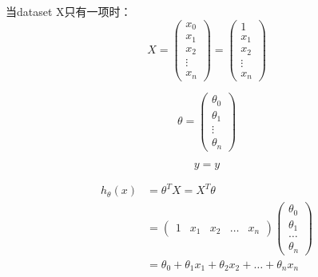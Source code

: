 \documentclass[12pt]{article}   %
\begin{document}
当dataset X只有一项时：
\begin{equation}
X = 
	\left(
		\begin{matrix}
			x_0 \\
			x_1 \\
			x_2 \\
			\vdots \\
			x_n
		\end{matrix}
	\right) 
= 
  	\left(
		\begin{matrix}
			1 \\
			x_1 \\
			x_2 \\
			\vdots \\
			x_n
		\end{matrix}
	\right)
\end{equation}

\begin{equation}
\theta = 
	\left(
		\begin{matrix}
			\theta_0 \\
			\theta_1 \\
			\vdots \\
			\theta_n
		\end{matrix}
	\right)
\end{equation}

\begin{equation}
y = y
\end{equation}

\begin{equation}
\begin{aligned}
	h_{\theta}(x) & = \theta^{T}X = X^T\theta \\
	& = 
		\left(
			\begin{matrix}
				1 & x_1 & x_2 & \dots & x_n
			\end{matrix}
		\right)
		\left(
			\begin{matrix}
			\theta_0 \\
			\theta_1 \\
			\dots \\
			\theta_n
			\end{matrix}
		\right) \\
	& = \theta_0 + \theta_1x_1 + \theta_2x_2 + \dots + \theta_nx_n
\end{aligned}
\end{equation}
\end{document}
